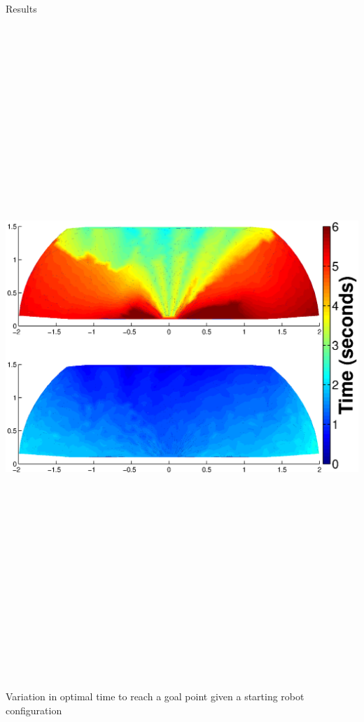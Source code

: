 \documentclass[final]{beamer}
\begin{document}
\begin{frame}{}
{\begin{columns}[t]
\begin{column}{.30\linewidth}
\begin{block}{\centering Results}
	\centering\includegraphics[height=25cm, width=25cm]{figures/MinTime_Controllers_vs_Optimal_Final.eps}

Variation in optimal time to reach a goal point given a starting robot configuration

\vspace{2cm}



\end{block}
\end{column}
\end{columns}}
\end{frame}
\end{document}
